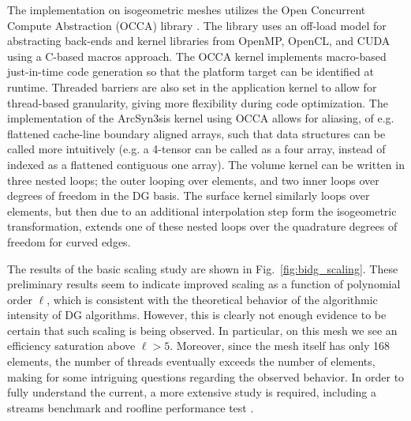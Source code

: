 The implementation on isogeometric meshes utilizes the Open Concurrent Compute Abstraction (OCCA) library \cite{MedinaPress}.  The library uses an off-load model for abstracting back-ends and kernel libraries from OpenMP, OpenCL, and CUDA using a C-based macros approach.  The OCCA kernel implements macro-based just-in-time code generation so that the platform target can be identified at runtime.  Threaded barriers are also set in the application kernel to allow for thread-based granularity, giving more flexibility during code optimization.  The implementation of the ArcSyn3sis kernel using OCCA allows for aliasing, of e.g. flattened cache-line boundary aligned arrays, such that data structures can be called more intuitively (e.g. a 4-tensor can be called as a four array, instead of indexed as a flattened contiguous one array).  The volume kernel can be written in three nested loops; the outer looping over elements, and two inner loops over degrees of freedom in the DG basis.  The surface kernel similarly loops over elements, but then due to an additional interpolation step form the isogeometric transformation, extends one of these nested loops over the quadrature degrees of freedom for curved edges.

The results of the basic scaling study are shown in Fig.~\ref{fig:bidg_scaling}.  These preliminary results seem to indicate improved scaling as a function of polynomial order $\ell$, which is consistent with the theoretical behavior of the algorithmic intensity of DG algorithms.  However, this is clearly not enough evidence to be certain that such scaling is being observed.  In particular, on this mesh we see an efficiency saturation above $\ell>5$.  Moreover, since the mesh itself has only 168 elements, the number of threads eventually exceeds the number of elements, making for some intriguing questions regarding the observed behavior.  In order to fully understand the current, a more extensive study is required, including a streams benchmark \cite{McCalpin1995} and roofline performance test \cite{Williams:2009:RIV:1498765.1498785}.


%
%






